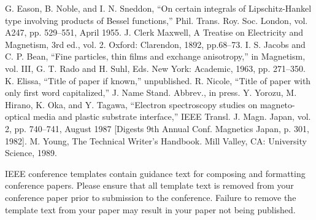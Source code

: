 \documentclass[conference]{IEEEtran}
\begin{document}
\begin{thebibliography}{99}
 G. Eason, B. Noble, and I. N. Sneddon, ``On certain integrals of Lipschitz-Hankel type involving products of Bessel functions,'' Phil. Trans. Roy. Soc. London, vol. A247, pp. 529--551, April 1955.
 J. Clerk Maxwell, A Treatise on Electricity and Magnetism, 3rd ed., vol. 2. Oxford: Clarendon, 1892, pp.68--73.
 I. S. Jacobs and C. P. Bean, ``Fine particles, thin films and exchange anisotropy,'' in Magnetism, vol. III, G. T. Rado and H. Suhl, Eds. New York: Academic, 1963, pp. 271--350.
 K. Elissa, ``Title of paper if known,'' unpublished.
 R. Nicole, ``Title of paper with only first word capitalized,'' J. Name Stand. Abbrev., in press.
 Y. Yorozu, M. Hirano, K. Oka, and Y. Tagawa, ``Electron spectroscopy studies on magneto-optical media and plastic substrate interface,'' IEEE Transl. J. Magn. Japan, vol. 2, pp. 740--741, August 1987 [Digests 9th Annual Conf. Magnetics Japan, p. 301, 1982].
 M. Young, The Technical Writer's Handbook. Mill Valley, CA: University Science, 1989.
\end{thebibliography}
\vspace{12pt}
\color{red}
IEEE conference templates contain guidance text for composing and formatting conference papers. Please ensure that all template text is removed from your conference paper prior to submission to the conference. Failure to remove the template text from your paper may result in your paper not being published.
\end{document}
